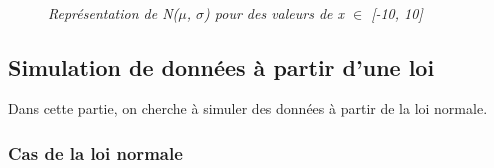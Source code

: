 \documentclass{article}      %
\begin{document}
\begin{figure}[H]
    \centering
    \\
    \textit{Représentation de N($\mu$, $\sigma$) pour des valeurs de x $\in$ [-10, 10]}
\end{figure}

\subsection{Simulation de données à partir d’une loi}
Dans cette partie, on cherche à simuler des données à partir de la loi normale.\\
\subsubsection{Cas de la loi normale}
\end{document}
